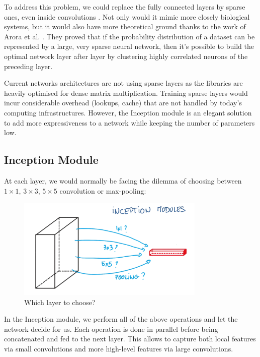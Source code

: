To address this problem, we could replace the fully connected layers by sparse ones, even inside convolutions \cite{googlenet}. Not only would it mimic more closely biological systems, but it would also have more theoretical ground thanks to the work of Arora et al. \cite{arora}. They proved that if the probability distribution of a dataset can be represented by a large, very sparse neural network, then it's possible to build the optimal network layer after layer by clustering highly correlated neurons of the preceding layer. 

Current networks architectures are not using sparse layers as the libraries are heavily optimised for dense matrix multiplication. Training sparse layers would incur considerable overhead (lookups, cache) that are not handled by today's computing infrastructures. However, the Inception module is an elegant solution to add more expressiveness to a network while keeping the number of parameters low. 

\subsection{Inception Module}
At each layer, we would normally be facing the dilemma of choosing between $1\times 1$, $3\times 3$, $5\times5$ convolution or max-pooling:

\begin{figure}[H]
    \centering
    \includegraphics[width=0.8\textwidth]{Images/inceptionmodule.png}
    \caption{Which layer to choose? \cite{inceptionmodule}}
\end{figure}

In the Inception module, we perform all of the above operations and let the network decide for us. Each operation is done in parallel before being concatenated and fed to the next layer. This allows to capture both local features via small convolutions and more high-level features via large convolutions. 

